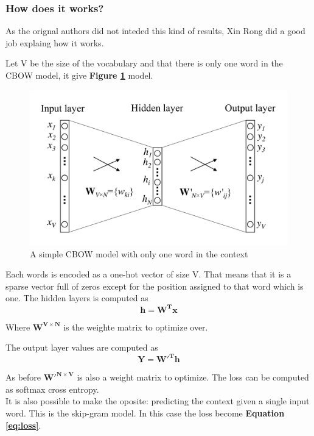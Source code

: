 \subsubsection{How does it works?} 
As the orignal authors did not inteded this kind of results, Xin Rong\cite{Rong2014} did a good job explaing how it works. 

Let V be the size of the vocabulary and that there is only one word in the CBOW model, it give \textbf{Figure \ref{fig:chap4:CBOW}} model. 

\begin{figure}
	\centering
	\includegraphics[width=\textwidth]{images/chapitre4/CBOW}
	\caption{A simple CBOW model with only one word in the context}
	\label{fig:chap4:CBOW}
\end{figure}

Each words is encoded as a one-hot vector of size V. That means that it is a sparse vector full of zeros except for the position assigned to that word which is one. The hidden layers is computed as 
\begin{equation}
	\mathbf{h} = \mathbf{W^Tx}
\end{equation}

Where $\mathbf{W^{V \times N}}$ is the weighte matrix to optimize over. 

The output layer values are computed as 
\begin{equation}
	\mathbf{Y} = \mathbf{W'^Th}
\end{equation}

As before $\mathbf{W'^{N \times V}}$ is also a weight matrix to optimize. The loss can be computed as softmax cross entropy. \\

It is also possible to make the oposite: predicting the context given a single input word. This is the skip-gram model. In this case the loss become \textbf{Equation \ref{eq:loss}}.

